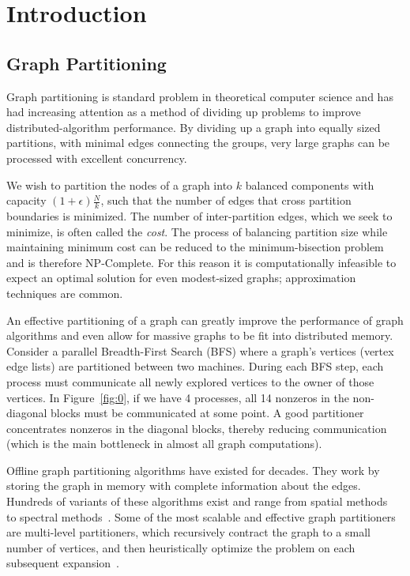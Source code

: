 \section{Introduction}
\subsection{Graph Partitioning}
Graph partitioning is standard problem in theoretical computer science and has had increasing attention as a method of dividing up problems to improve distributed-algorithm performance.
By dividing up a graph into equally sized partitions, with minimal edges connecting the groups, very large graphs can be processed with excellent concurrency. 

We wish to partition the nodes of a graph into $k$ balanced components with capacity $(1+\epsilon)\frac{N}{k}$, such that the number of edges that cross partition boundaries is minimized.
The number of inter-partition edges, which we seek to minimize, is often called the \textit{cost}.
The process of balancing partition size while maintaining minimum cost can be reduced to the minimum-bisection problem~\cite{Garey:1979:CIG:578533} and is therefore NP-Complete.
For this reason it is computationally infeasible to expect an optimal solution for even modest-sized graphs; approximation techniques are common.

An effective partitioning of a graph can greatly improve the performance of graph algorithms and even allow for massive graphs to be fit into distributed memory.
Consider a parallel Breadth-First Search (BFS) where a graph's vertices (vertex edge lists) are partitioned between two machines.
During each BFS step, each process must communicate all newly explored vertices to the owner of those vertices.
In Figure~\ref{fig:0}, if we have 4 processes, all 14 nonzeros in the non-diagonal blocks must be communicated at some point.
A good partitioner concentrates nonzeros in the diagonal blocks, thereby reducing communication (which is the main bottleneck in almost all graph computations).

Offline graph partitioning algorithms have existed for decades.
They work by storing the graph in memory with complete information about the edges.
Hundreds of variants of these algorithms exist and range from spatial methods~\cite{Gilbert95geometricmesh} to spectral methods~\cite{arora2009expander}.
Some of the most scalable and effective graph partitioners are multi-level partitioners, which recursively contract the graph to a small number of vertices, and then heuristically optimize the problem on each subsequent expansion~\cite{karypis1998multilevel}.

